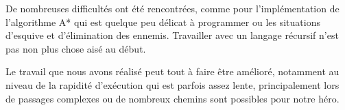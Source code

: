 \documentclass[a4paper,11pt]{article}
\begin{document}
De nombreuses difficultés ont été rencontrées, comme pour l’implémentation de l’algorithme A* qui est quelque peu délicat à programmer ou les situations d’esquive et d’élimination des ennemis. Travailler avec un langage récursif n’est pas non plus chose aisé au début.

Le travail que nous avons réalisé peut tout à faire être amélioré, notamment au niveau de la rapidité d’exécution qui est parfois assez lente, principalement lors de passages complexes ou de nombreux chemins sont possibles pour notre héro.  
	
	\newpage
	\tableofcontents
\end{document}
